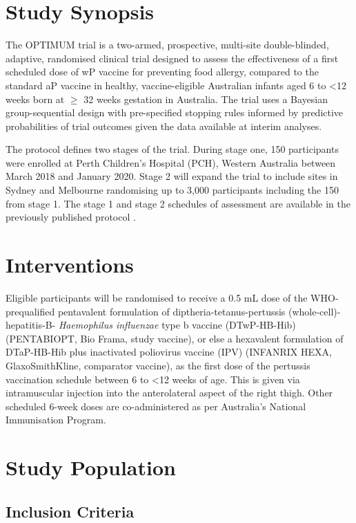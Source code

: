 \documentclass{bmcart}
\begin{document}
\section*{Study Synopsis}

The OPTIMUM trial is a two-armed, prospective, multi-site double-blinded, adaptive, randomised clinical trial designed to assess the effectiveness of a first scheduled dose of wP vaccine for preventing food allergy, compared to the standard aP vaccine in healthy, vaccine-eligible Australian infants aged 6 to \textless12 weeks born at \(\geq\) 32 weeks gestation in Australia.
The trial uses a Bayesian group-sequential design with pre-specified stopping rules informed by predictive probabilities of trial outcomes given the data available at interim analyses.

The protocol defines two stages of the trial.
During stage one, 150 participants were enrolled at Perth Children's Hospital (PCH), Western Australia between March 2018 and January 2020.
Stage 2 will expand the trial to include sites in Sydney and Melbourne randomising up to 3,000 participants including the 150 from stage 1.
The stage 1 and stage 2 schedules of assessment are available in the previously published protocol \cite{perez2020}.

\section*{Interventions}

Eligible participants will be randomised to receive a 0.5 mL dose of the WHO-prequalified pentavalent formulation of diptheria-tetanus-pertussis (whole-cell)-hepatitis-B- \textit{Haemophilus influenzae} type b vaccine (DTwP-HB-Hib) (PENTABIO\textregistered PT, Bio Frama, study vaccine), or else a hexavalent formulation of DTaP-HB-Hib plus inactivated poliovirus vaccine (IPV) (INFANRIX HEXA\textregistered, GlaxoSmithKline, comparator vaccine), as the first dose of the pertussis vaccination schedule between 6 to \textless 12 weeks of age.
This is given via intramuscular injection into the anterolateral aspect of the right thigh.
Other scheduled 6-week doses are co-administered as per Australia's National Immunisation Program.

\section*{Study Population}

\subsection*{Inclusion Criteria}
\end{document}
